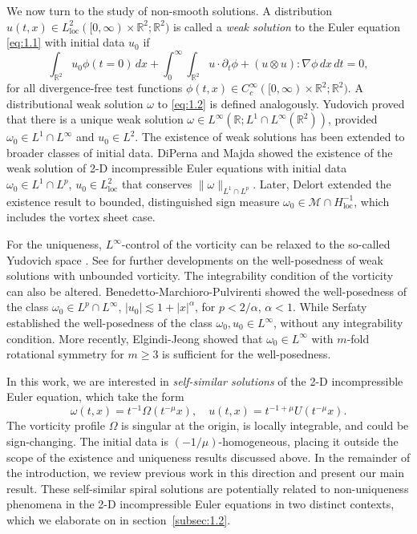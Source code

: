 \documentclass[11pt]{article}
\theoremstyle{definition}
\theoremstyle{remark}
\numberwithin{equation}{section}
\newcommand{\mbb}{\mathbb}
\newcommand{\mcal}{\mathcal}
\newcommand{\R}{\mbb{R}}
\newcommand{\del}{\partial}
\newcommand{\grad}{\nabla}
\newcommand{\norm}[1]{\lVert #1 \rVert}
\begin{document}
We now turn to the study of non-smooth solutions. A distribution $u(t,x) \in L^2_{\text{loc}}([0,\infty) \times \R^2; \R^2)$ is called a \textit{weak solution} to the Euler equation \eqref{eq:1.1} with initial data $u_0$ if
\begin{equation*}
\int_{\R^2} u_0 \phi(t=0) \,dx + \int_0^\infty \int_{\R^2} u \cdot \del_t \phi + (u \otimes u) : \grad \phi \,dx \,dt = 0,
\end{equation*}
for all divergence-free test functions $\phi(t,x) \in C^\infty_c([0,\infty) \times \R^2;\R^2)$. A distributional weak solution $\omega$ to \eqref{eq:1.2} is defined analogously. Yudovich \cite{Yud63} proved that there is a unique weak solution $\omega \in L^\infty(\R; L^1\cap L^\infty(\R^2))$, provided $\omega_0 \in L^1\cap L^\infty$ and $u_0\in L^2$. The existence of weak solutions has been extended to broader classes of initial data. DiPerna and Majda \cite{DM87} showed the existence of the weak solution of 2-D incompressible Euler equations with initial data $\omega_0 \in L^1 \cap L^p$, $u_0 \in L^2_{\text{loc}}$ that conserves $\norm{\omega}_{L^1\cap L^p}$. Later, Delort \cite{Del91} extended the existence result to bounded, distinguished sign measure $\omega_0 \in \mcal{M} \cap H^{-1}_{\text{loc}}$, which includes the vortex sheet case.

For the uniqueness, $L^\infty$-control of the vorticity can be relaxed to the so-called Yudovich space \cite{Yud95}. See \cite{Tan04, BK14, BH15} for further developments on the well-posedness of weak solutions with unbounded vorticity. The integrability condition of the vorticity can also be altered. Benedetto-Marchioro-Pulvirenti \cite{BMP93} showed the well-posedness of the class $\omega_0 \in L^p \cap L^\infty$, $|u_0| \lesssim 1 + |x|^\alpha$, for $p<2/\alpha$, $\alpha < 1$. While Serfaty \cite{Ser95} established the well-posedness of the class $\omega_0, u_0 \in L^\infty$, without any integrability condition. More recently, Elgindi-Jeong \cite{EJ20} showed that $\omega_0 \in L^\infty$ with $m$-fold rotational symmetry for $m\geq 3$ is sufficient for the well-posedness.

In this work, we are interested in \textit{self-similar solutions} of the 2-D incompressible Euler equation, which take the form
\begin{equation} \label{eq:1.3}
\omega(t,x) = t^{-1}\Omega(t^{-\mu} x), \quad u(t,x) = t^{-1+\mu} U(t^{-\mu}x).
\end{equation}
The vorticity profile $\Omega$ is singular at the origin, is locally integrable, and could be sign-changing. The initial data is $(-1/\mu)$-homogeneous, placing it outside the scope of the existence and uniqueness results discussed above. In the remainder of the introduction, we review previous work in this direction and present our main result. These self-similar spiral solutions are potentially related to non-uniqueness phenomena in the 2-D incompressible Euler equations in two distinct contexts, which we elaborate on in section~\ref{subsec:1.2}.
\end{document}
